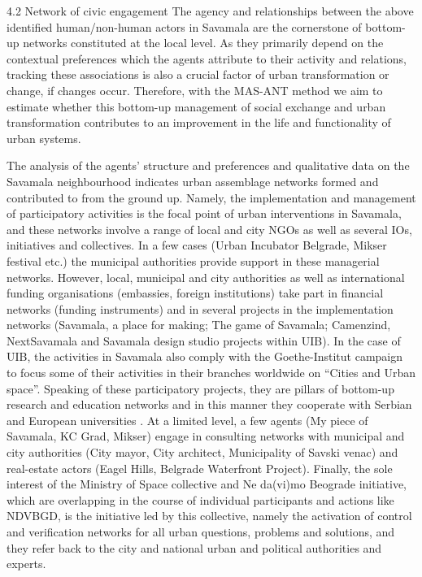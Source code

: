\documentclass[11pt]{report}
\begin{document}
4.2 Network of civic engagement
The agency and relationships between the above identified human/non-human actors in Savamala are the cornerstone of bottom-up networks constituted at the local level. As they primarily depend on the contextual preferences which the agents attribute to their activity and relations, tracking these associations is also a crucial factor of urban transformation or change, if changes occur. Therefore, with the MAS-ANT method we aim to estimate whether this bottom-up management of social exchange and urban transformation contributes to an improvement in the life and functionality of urban systems.

The analysis of the agents’ structure and preferences and qualitative data on the Savamala neighbourhood indicates urban assemblage networks formed and contributed to from the ground up. Namely, the implementation and management of participatory activities is the focal point of urban interventions in Savamala, and these networks involve a range of local and city NGOs as well as several IOs, initiatives and collectives. In a few cases (Urban Incubator Belgrade, Mikser festival etc.) the municipal authorities provide support in these managerial networks. However, local, municipal and city authorities as well as international funding organisations (embassies, foreign institutions) take part in financial networks (funding instruments) and in several projects in the implementation networks (Savamala, a place for making; The game of Savamala; Camenzind, NextSavamala and Savamala design studio projects within UIB). In the case of UIB, the activities in Savamala also comply with the Goethe-Institut campaign to focus some of their activities in their branches worldwide on “Cities and Urban space”. Speaking of these participatory projects, they are pillars of bottom-up research and education networks and in this manner they cooperate with Serbian and European universities . At a limited level, a few agents (My piece of Savamala, KC Grad, Mikser) engage in consulting networks with municipal and city authorities (City mayor, City architect, Municipality of Savski venac) and real-estate actors (Eagel Hills, Belgrade Waterfront Project). Finally, the sole interest of the Ministry of Space collective and Ne da(vi)mo Beograde initiative, which are overlapping in the course of individual participants and actions like NDVBGD, is the initiative led by this collective, namely the activation of control and verification networks for all urban questions, problems and solutions, and they refer back to the city and national urban and political authorities and experts.
\end{document}
